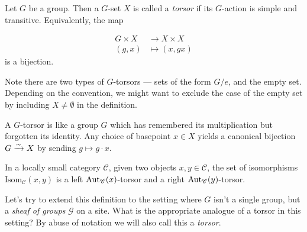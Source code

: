 \documentclass[11pt,openany]{book}
\begin{document}
\begin{definition} Let $G$ be a group. Then a $G$-set $X$ is called a \textit{torsor} if its $G$-action is simple and transitive. Equivalently, the map

\begin{equation}\label{eqn:torsor-G-set}
\begin{aligned}
    G \times X &\to X \times X \\
    (g,x) &\mapsto (x,gx)
\end{aligned}
\end{equation}
is a bijection.
\end{definition}

Note there are two types of $G$-torsors --- sets of the form $G/e$, and the empty set. Depending on the convention, we might want to exclude the case of the empty set by including $X \ne \emptyset$ in the definition.

\begin{intuition} A $G$-torsor is like a group $G$ which has remembered its multiplication but forgotten its identity. Any choice of basepoint $x\in X$ yields a canonical bijection $G \xrightarrow{\sim} X$ by sending $g \mapsto g\cdot x$.
\end{intuition}

\begin{example} In a locally small category $\mathscr{C}$, given two objects $x,y \in \mathscr{C}$, the set of isomorphisms $\mathrm{Isom}_{\mathscr{C}}(x , y)$ is a left $\mathrm{Aut}_{\mathscr{C}}(x)$-torsor and a right $\mathrm{Aut}_{\mathscr{C}}(y)$-torsor.
\end{example}


Let's try to extend this definition to the setting where $G$ isn't a single group, but a \textit{sheaf of groups} $\mathcal{G}$ on a site. What is the appropriate analogue of a torsor in this setting? By abuse of notation we will also call this a \textit{torsor}.
\end{document}
